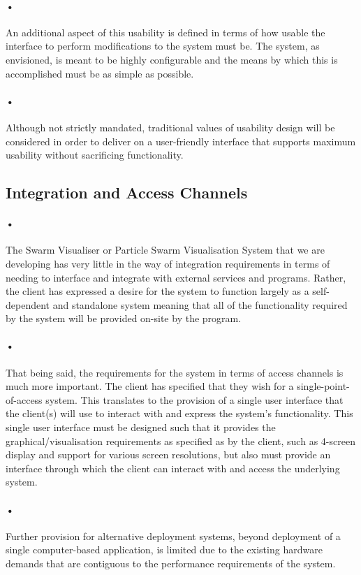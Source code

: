 \documentclass[11pt]{article}
\begin{document}
\paragraph{•}
An additional aspect of this usability is defined in terms of how usable the interface to perform modifications to the system must be. The system, as envisioned, is meant to be highly configurable and the means by which this is accomplished must be as simple as possible. 

\paragraph{•}
Although not strictly mandated, traditional values of usability design will be considered in order to deliver on a user-friendly interface that supports maximum usability without sacrificing functionality.
\subsection{Integration and Access Channels}
\paragraph{•}
The Swarm Visualiser or Particle Swarm Visualisation System that we are developing has very little in the way of integration requirements in terms of needing to interface and integrate with external services and programs. Rather, the client has expressed a desire for the system to function largely as a self-dependent and standalone system meaning that all of the functionality required by the system will be provided on-site by the program.

\paragraph{•}
That being said, the requirements for the system in terms of access channels is much more important. The client has specified that they wish for a single-point-of-access system. This translates to the provision of a single user interface that the client(s) will use to interact with and express the system's functionality. This single user interface must be designed such that it provides the graphical/visualisation requirements as specified as by the client, such as 4-screen display and support for various screen resolutions, but also must provide an interface through which the client can interact with and access the underlying system.

\paragraph{•}
Further provision for alternative deployment systems, beyond deployment of a single computer-based application, is limited due to the existing hardware demands that are contiguous to the performance requirements of the system.
\end{document}
